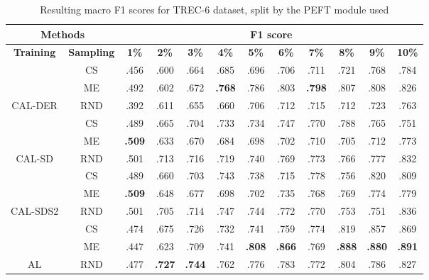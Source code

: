 \begin{table}[htbp]
\begin{subtable}{\linewidth}
\begin{tabular}{c|c|cccccccccc}
\toprule
\multicolumn{2}{c|}{\textbf{Methods}} & \multicolumn{10}{c}{\textbf{F1 score}} \\
\midrule
\textbf{Training} & \textbf{Sampling} & \textbf{1\%} & \textbf{2\%} & \textbf{3\%} & \textbf{4\%} & \textbf{5\%} & \textbf{6\%} & \textbf{7\%} & \textbf{8\%} & \textbf{9\%} & \textbf{10\%}\\
\midrule
 & CS & .456 & .600 & .664 & .685 & .696 & .706 & .711 & .721 & .768 & .784\\

 & ME & .492 & .602 & .672 & \textbf{.768} & .786 & .803 & \textbf{.798} & .807 & .808 & .826\\

\multirow{-3}{*}{\raggedright\arraybackslash CAL-DER} & RND & .392 & .611 & .655 & .660 & .706 & .712 & .715 & .712 & .723 & .763\\
\midrule
 & CS & .489 & .665 & .704 & .733 & .734 & .747 & .770 & .788 & .765 & .751\\

 & ME & \textbf{.509} & .633 & .670 & .684 & .698 & .702 & .710 & .705 & .712 & .773\\

\multirow{-3}{*}{\raggedright\arraybackslash CAL-SD} & RND & .501 & .713 & .716 & .719 & .740 & .769 & .773 & .766 & .777 & .832\\
\midrule
 & CS & .489 & .660 & .703 & .743 & .738 & .715 & .778 & .756 & .820 & .809\\

 & ME & \textbf{.509} & .648 & .677 & .698 & .702 & .735 & .768 & .769 & .774 & .779\\

\multirow{-3}{*}{\raggedright\arraybackslash CAL-SDS2} & RND & .501 & .705 & .714 & .747 & .744 & .772 & .770 & .753 & .751 & .836\\
\midrule
 & CS & .474 & .675 & .726 & .732 & .741 & .759 & .774 & .819 & .857 & .869\\

 & ME & .447 & .623 & .709 & .741 & \textbf{.808} & \textbf{.866} & .769 & \textbf{.888} & \textbf{.880} & \textbf{.891}\\

\multirow{-3}{*}{\raggedright\arraybackslash AL} & RND & .477 & \textbf{.727} & \textbf{.744} & .762 & .776 & .783 & .772 & .804 & .786 & .827\\
\bottomrule
\end{tabular}
\end{subtable}
\caption{Resulting macro F1 scores for TREC-6 dataset, split by the PEFT module used}
\label{tab:results_short_trec_10}
\end{table}
